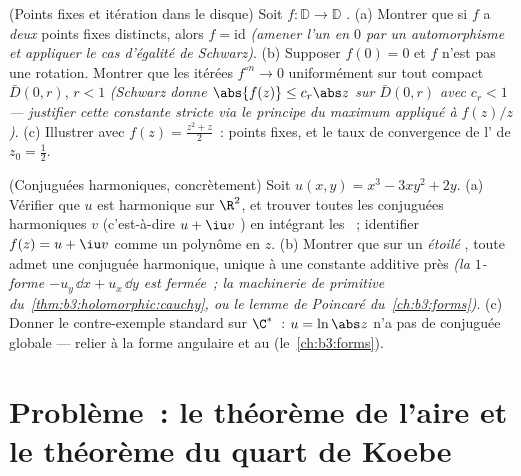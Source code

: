 \begin{exercise}[$\star\star$]\label{exo:b3:conformal:11}
(Points fixes et itération dans le disque) Soit
$f\colon\mathbb D \to \mathbb D$ .
(a) Montrer que si $f$ a \emph{deux} points fixes distincts,
alors $f = \mathrm{id}$ \emph{(amener l'un en $0$ par un
automorphisme et appliquer le cas d'égalité de Schwarz)}.
(b) Supposer $f(0) = 0$ et $f$ n'est pas une rotation.
Montrer que les itérées $f^{\circ n} \to 0$ uniformément sur
tout compact $\bar D(0, r)$, $r < 1$ \emph{(Schwarz donne
$\abs{f(z)} \leq c_r\abs z$ sur $\bar D(0,r)$ avec $c_r < 1$
--- justifier cette constante stricte via le principe du
maximum appliqué à $f(z)/z$)}.
(c) Illustrer avec $f(z) = \frac{z^2 + z}2$~: points fixes,
et le taux de convergence de l' de $z_0 =
\frac12$.
\end{exercise}

\begin{exercise}[$\star\star$]\label{exo:b3:conformal:12}
(Conjuguées harmoniques, concrètement) Soit $u(x, y) = x^3
- 3xy^2 + 2y$.
(a) Vérifier que $u$ est harmonique sur $\R^2$, et trouver
toutes les conjuguées harmoniques $v$ (c'est-à-dire $u + \iu
v$ ) en intégrant les ~; identifier $f(z) = u + \iu v$ comme un
polynôme en $z$.
(b) Montrer que sur un \emph{étoilé} , toute  admet une conjuguée harmonique, unique à une
constante additive près \emph{(la $1$-forme $-u_y\,\dd x +
u_x\,\dd y$ est fermée~; la machinerie de primitive
du~\cref{thm:b3:holomorphic:cauchy}, ou le lemme de Poincaré
du~\cref{ch:b3:forms})}.
(c) Donner le contre-exemple standard sur $\C^*$~: $u =
\ln\abs z$ n'a pas de conjuguée globale --- relier à la
forme angulaire et au 
(le~\cref{ch:b3:forms}).
\end{exercise}

\section{Problème~: le théorème de l'aire et le théorème du
quart de Koebe}

